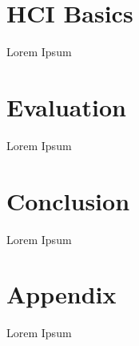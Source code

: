 \documentclass[11pt]{article}
\begin{document}
\pagebreak
\section{HCI Basics}
Lorem Ipsum

\pagebreak
\section{Evaluation}
Lorem Ipsum

\section{Conclusion}
Lorem Ipsum

\pagebreak
\section{Appendix}
Lorem Ipsum

\pagebreak


\end{document}
